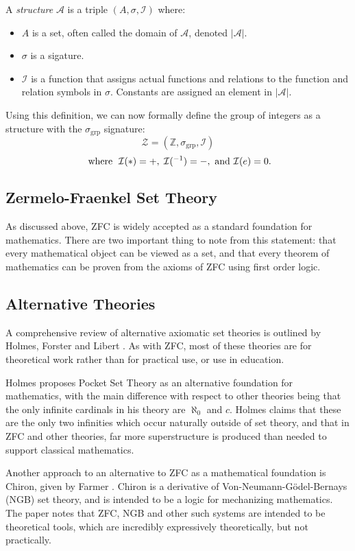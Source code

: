 \documentclass[12pt]{article}
\theoremstyle{definition}
\begin{document}
\noindent
A \emph{structure} $\mathcal{A}$ is a triple $(A, \sigma,\mathcal{I})$ where:
\begin{itemize}
  \item $A$ is a set, often called the domain of $\mathcal{A}$, denoted $|\mathcal{A}|$.
  \item $\sigma$ is a sigature.
  \item $\mathcal I$ is a function that assigns actual functions and relations to the function and relation symbols in $\sigma$. Constants are assigned an element in $|\mathcal{A}|$.
\end{itemize}
Using this definition, we can now formally define the group of integers as a structure with the $\sigma_{\text{grp}}$ signature:
$$\mathcal{Z} = (\mathbb{Z}, \sigma_{\text{grp}}, \mathcal{I})$$
$$\text{ where \hspace{1mm}} \mathcal{I}(*) = +,\hspace{1mm} \mathcal{I}(^{-1}) = -, \text{ and } \mathcal{I}(e) = 0.$$
\subsection{Zermelo-Fraenkel Set Theory}
As discussed above, ZFC is widely accepted as a standard foundation for mathematics. There are two important thing to note from this statement: that every mathematical object can be viewed as a set, and that every theorem of mathematics can be proven from the axioms of ZFC using first order logic.

\subsection{Alternative Theories}
A comprehensive review of alternative axiomatic set theories is outlined by Holmes, Forster and Libert \cite{ast}.
As with ZFC, most of these theories are for theoretical work rather than for practical use, or use in education.

Holmes proposes Pocket Set Theory \cite{pocket} as an alternative foundation for mathematics, with the main difference with respect to other theories being that the only infinite cardinals in his theory are $\aleph_0$ and $c$.
Holmes claims that these are the only two infinities which occur naturally outside of set theory, and that in ZFC and other theories, far more superstructure is produced than needed to support classical mathematics.

Another approach to an alternative to ZFC as a mathematical foundation is Chiron, given by Farmer \cite{chiron}. Chiron is a derivative of Von-Neumann-G\"odel-Bernays (NGB) set theory, and is intended to be a logic for mechanizing mathematics. The paper notes that ZFC, NGB and other such systems are intended to be theoretical tools, which are incredibly expressively theoretically, but not practically.
\end{document}
